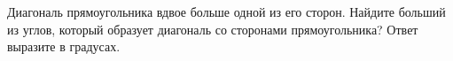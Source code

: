 \begin{ex}
	\begin{condition}
		Диагональ прямоугольника вдвое больше одной из его сторон. Найдите больший из углов, который образует диагональ со сторонами прямоугольника? Ответ выразите в градусах.
	\end{condition}
\end{ex}